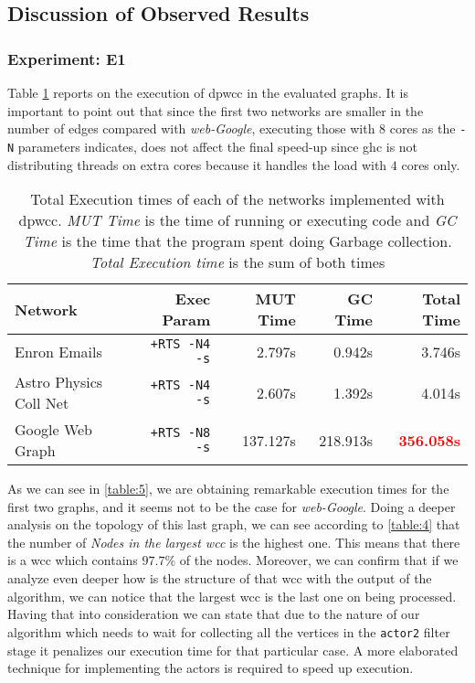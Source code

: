 \subsection{Discussion of Observed Results}\label{new:experiments}
\subsubsection{Experiment: E1}\label{sub:new:sec:e1}
Table \ref{table:5} reports on the execution of \acrshort{dpwcc} in the evaluated graphs. 
It is important to point out that since the first two networks are smaller in the number of edges compared with \emph{web-Google}, executing those with $8$ cores as the \texttt{-N} parameters indicates, does not affect the final speed-up since \acrshort{ghc} is not distributing threads on extra cores because it handles the load with $4$ cores only.
\begin{table}[H]
  \centering
  \begin{tabular}{|l|r|r|r|r|}
   \hline
   \textbf{Network} & \textbf{Exec Param} & \textbf{MUT Time} & \textbf{GC Time} & \textbf{Total Time}\\
   \hline
   Enron Emails & \texttt{+RTS -N4 -s} & 2.797s & 0.942s & 3.746s \\
   \hline
   Astro Physics Coll Net & \texttt{+RTS -N4 -s} & 2.607s & 1.392s & 4.014s \\
   \hline
   Google Web Graph & \texttt{+RTS -N8 -s} & 137.127s & 218.913s & \textbf{\textcolor{red}{356.058s}} \\
   \hline
  \end{tabular}
  \caption{Total Execution times of each of the networks implemented with \acrshort{dpwcc}. \textit{MUT Time} is the time of running or executing code and \textit{GC Time} is the time that the program spent doing Garbage collection. \textit{Total Execution time} is the sum of both times}
 \label{table:5}
 \end{table}



As we can see in \autoref{table:5}, we are obtaining remarkable execution times for the first two graphs, and it seems not to be the case for \textit{web-Google}. Doing a deeper analysis on the topology of this last graph, we can see according to \autoref{table:4} that the number of \textit{Nodes in the largest \acrshort{wcc}} is the highest one. This means that there is a \acrshort{wcc} which contains $97.7\%$ of the nodes. Moreover, we can confirm that if we analyze even deeper how is the structure of that \acrshort{wcc} with the output of the algorithm, we can notice that the largest \acrshort{wcc} is the last one on being processed. Having that into consideration we can state that due to the nature of our algorithm which needs to wait for collecting all the vertices in the \texttt{actor2} filter stage 
it penalizes our execution time for that particular case. A more elaborated technique for implementing the actors is required to speed up execution. 

